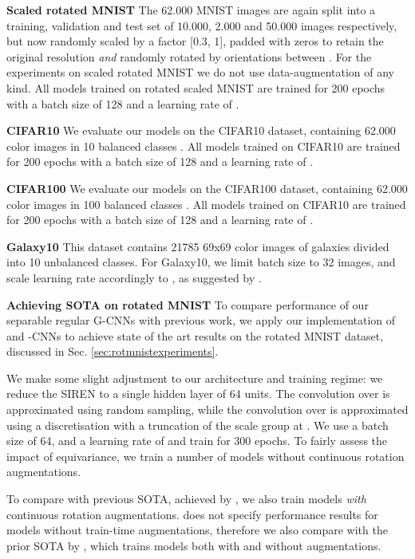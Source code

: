 \documentclass[nohyperref]{article}
\theoremstyle{plain}
\theoremstyle{definition}
\theoremstyle{remark}
\begin{document}
\textbf{Scaled rotated MNIST} The 62.000 MNIST images are again split into a training, validation and test set of 10.000, 2.000 and 50.000 images respectively, but now randomly scaled by a factor [0.3, 1],  padded with zeros to retain the original resolution \textit{and} randomly rotated by orientations between . For the experiments on scaled rotated MNIST we do not use data-augmentation of any kind. All models trained on rotated scaled MNIST are trained for 200 epochs with a batch size of 128 and a learning rate of . 

\textbf{CIFAR10} We evaluate our models on the CIFAR10 dataset, containing 62.000  color images in 10 balanced classes \citep{krizhevsky2009learning}. All models trained on CIFAR10 are trained for 200 epochs with a batch size of 128 and a learning rate of .

\textbf{CIFAR100} We evaluate our models on the CIFAR100 dataset, containing 62.000  color images in 100 balanced classes \citep{krizhevsky2009learning}. All models trained on CIFAR10 are trained for 200 epochs with a batch size of 128 and a learning rate of .

\textbf{Galaxy10} This dataset contains 21785 69x69 color images of galaxies divided into 10 unbalanced classes. For Galaxy10, we limit batch size to 32 images, and scale learning rate accordingly to , as suggested by \citet{goyal2017accurate}.

\textbf{Achieving SOTA on rotated MNIST}\label{app:rotmnistsota}
To compare performance of our separable regular G-CNNs with previous work, we apply our implementation of  and -CNNs to achieve state of the art results on the rotated MNIST dataset, discussed in Sec. \ref{sec:rotmnistexperiments}.

We make some slight adjustment to our architecture and training regime: we reduce the SIREN to a single hidden layer of 64 units. The convolution over  is approximated using random sampling, while the convolution over  is approximated using a discretisation with a truncation of the scale group at . We use a batch size of 64, and a learning rate of  and train for 300 epochs. To fairly assess the impact of equivariance, we train a number of models without continuous rotation augmentations.

To compare with previous SOTA, achieved by \citet{weiler2019general}, we also train models \textit{with} continuous rotation augmentations. \citet{weiler2019general} does not specify performance results for models without train-time augmentations, therefore we also compare with the prior SOTA by \citet{weiler2018learning}, which trains models both with and without augmentations.
\end{document}
